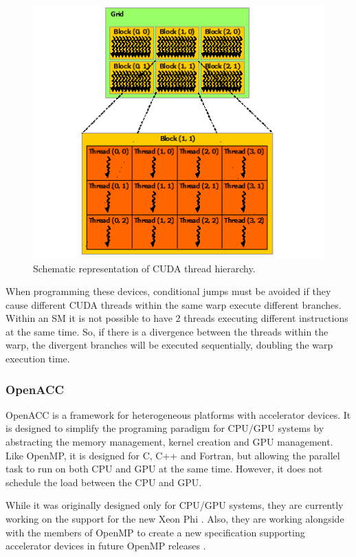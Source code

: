 \begin{figure}[!htp]
	\begin{center}
		\includegraphics[scale=0.9]{../../common/img/cuda_hierarchy.png}
		\caption{Schematic representation of CUDA thread hierarchy.}
		\label{fig:CUDAHierarchy}
	\end{center}
\end{figure}

When programming these devices, conditional jumps must be avoided if they cause different CUDA threads within the same warp execute different branches. Within an SM it is not possible to have 2 threads executing different instructions at the same time. So, if there is a divergence between the threads within the warp, the divergent branches will be executed sequentially, doubling the warp execution time.

\subsubsection*{OpenACC}
\label{OpenACC}

OpenACC \cite{OpenACC} is a framework for heterogeneous platforms with accelerator devices. It is designed to simplify the programing paradigm for CPU/GPU systems by abstracting the memory management, kernel creation and GPU management. Like OpenMP, it is designed for C, C++ and Fortran, but allowing the parallel task to run on both CPU and GPU at the same time. However, it does not schedule the load between the CPU and GPU.

While it was originally designed only for CPU/GPU systems, they are currently working on the support for the new \intel Xeon Phi \cite{OpenACC:HPCWire}. Also, they are working alongside with the members of OpenMP to create a new specification supporting accelerator devices in future OpenMP releases \cite{OpenACC:OpenMP}.


